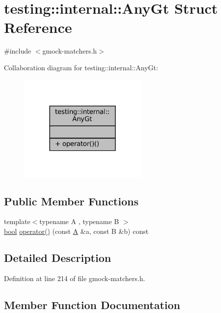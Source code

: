 \hypertarget{structtesting_1_1internal_1_1AnyGt}{}\section{testing\+:\+:internal\+:\+:Any\+Gt Struct Reference}
\label{structtesting_1_1internal_1_1AnyGt}


{\ttfamily \#include $<$gmock-\/matchers.\+h$>$}



Collaboration diagram for testing\+:\+:internal\+:\+:Any\+Gt\+:
\nopagebreak
\begin{figure}[H]
\begin{center}
\leavevmode
\includegraphics[width=180pt]{structtesting_1_1internal_1_1AnyGt__coll__graph}
\end{center}
\end{figure}
\subsection*{Public Member Functions}
\begin{DoxyCompactItemize}
\item 
{\footnotesize template$<$typename A , typename B $>$ }\\\hyperlink{classbool}{bool} \hyperlink{structtesting_1_1internal_1_1AnyGt_a710d341cb9f9d1a44ed7233409461dd6}{operator()} (const \hyperlink{namespacetesting_a5e9134d655d2fc9323902348083282e7}{A} \&a, const B \&b) const
\end{DoxyCompactItemize}


\subsection{Detailed Description}


Definition at line 214 of file gmock-\/matchers.\+h.



\subsection{Member Function Documentation}
\mbox{\label{structtesting_1_1internal_1_1AnyGt_a710d341cb9f9d1a44ed7233409461dd6}} 
